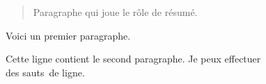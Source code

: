\documentclass{article}
\begin{document}
\begin{abstract}
  Paragraphe qui joue le rôle de résumé.
\end{abstract}
 
Voici un premier paragraphe.

Cette ligne contient le second paragraphe.
Je peux effectuer\\ des sauts de ligne.
\end{document}
